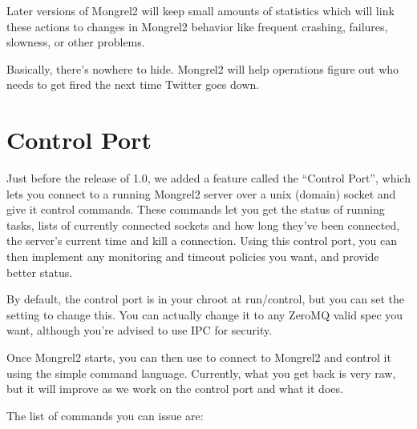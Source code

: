 Later versions of Mongrel2 will keep small amounts of statistics which will link these actions
to changes in Mongrel2 behavior like frequent crashing, failures, slowness, or other problems.

Basically, there's nowhere to hide.  Mongrel2 will help operations figure out who needs to
get fired the next time Twitter goes down.


\section{Control Port}

Just before the release of 1.0, we added a feature called the ``Control Port'', which
lets you connect to a running Mongrel2 server over a unix (domain) socket and
give it control commands.  These commands let you get the status of running
tasks, lists of currently connected sockets and how long they've been connected,
the server's current time and kill a connection.  Using this control port, you
can then implement any monitoring and timeout policies you want, and provide
better status.

By default, the control port is in your chroot at run/control, but you can set
the  setting to change this.  You can actually change it
to any ZeroMQ valid spec you want, although you're advised to use IPC for security.

Once Mongrel2 starts, you can then use  to connect to Mongrel2 and 
control it using the simple command language.  Currently, what you get back is
very raw, but it will improve as we work on the control port and what it does.

The list of commands you can issue are:

